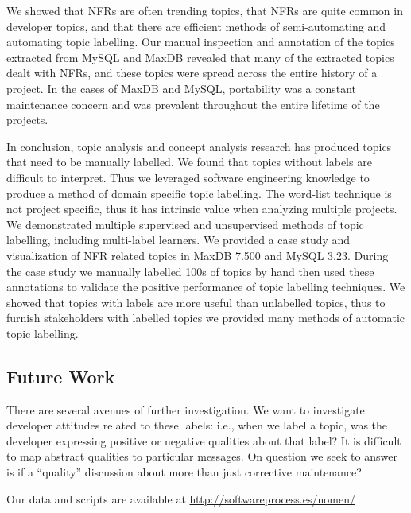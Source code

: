 \documentclass[]{sig-alternate}
\begin{document}
We showed that NFRs are often trending topics, that NFRs are quite common in developer topics, and that there are efficient methods of semi-automating and automating topic labelling.
Our manual inspection and annotation of the topics extracted from MySQL and MaxDB revealed that many of the extracted topics dealt with NFRs, and these topics were spread across the entire history of a project. 
In the cases of MaxDB and MySQL, portability was a constant maintenance concern and was prevalent throughout the entire lifetime of the projects.

In conclusion,
topic analysis and concept analysis research has produced topics that need to be manually labelled. 
We found that topics without labels are difficult to interpret.
Thus we leveraged software engineering knowledge to produce a method of domain specific topic labelling.
The word-list technique is not project specific, thus it has intrinsic value when analyzing multiple projects.
We demonstrated multiple supervised and unsupervised methods of topic labelling, including multi-label learners.
We provided a case study and visualization of NFR related topics in MaxDB 7.500 and MySQL 3.23. 
During the case study we manually labelled 100s of topics by hand then used these annotations to validate the positive performance of topic labelling techniques.
We showed that topics with labels are more useful than unlabelled topics, thus to furnish stakeholders with labelled topics we provided many methods of automatic topic labelling.

  
\subsection{Future Work}
 
There are several avenues of further investigation.  
We want to investigate developer attitudes related to these labels: i.e., when we label a topic, was the developer expressing positive or negative qualities about that label?  
It is difficult to map abstract qualities to particular messages. %
On question we seek to answer is if a ``quality'' discussion about more than just corrective maintenance? %
 

\appendix

Our data and scripts are available at \url{http://softwareprocess.es/nomen/}


%

\end{document}
